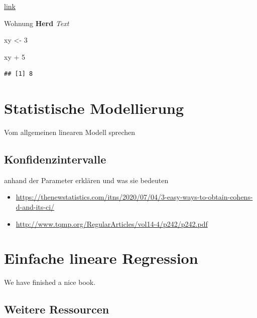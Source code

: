 \documentclass[
]{book}
\newenvironment{Shaded}{\begin{snugshade}}{\end{snugshade}}
\newcommand{\DecValTok}[1]{\textcolor[rgb]{0.00,0.00,0.81}{#1}}
\newcommand{\NormalTok}[1]{#1}
\newcommand{\OtherTok}[1]{\textcolor[rgb]{0.56,0.35,0.01}{#1}}
\newcommand{\SpecialCharTok}[1]{\textcolor[rgb]{0.00,0.00,0.00}{#1}}
\providecommand{\tightlist}{%
  \setlength{\itemsep}{0pt}\setlength{\parskip}{0pt}}
\begin{document}
\href{www.zeit.de}{link}

Wohnung \textbf{Herd} \emph{Text}

\begin{Shaded}
\begin{Highlighting}[]
\NormalTok{xy }\OtherTok{\textless{}{-}} \DecValTok{3} 
\end{Highlighting}
\end{Shaded}

\begin{Shaded}
\begin{Highlighting}[]
\NormalTok{xy }\SpecialCharTok{+} \DecValTok{5}
\end{Highlighting}
\end{Shaded}

\begin{verbatim}
## [1] 8
\end{verbatim}

\hypertarget{statistische-modellierung}{%
\chapter{Statistische Modellierung}\label{statistische-modellierung}}

Vom allgemeinen linearen Modell sprechen

\hypertarget{konfidenzintervalle}{%
\section{Konfidenzintervalle}\label{konfidenzintervalle}}

anhand der Parameter erklären und was sie bedeuten

\begin{itemize}
\tightlist
\item
  \url{https://thenewstatistics.com/itns/2020/07/04/3-easy-ways-to-obtain-cohens-d-and-its-ci/}
\item
  \url{http://www.tqmp.org/RegularArticles/vol14-4/p242/p242.pdf}
\end{itemize}

\hypertarget{einfache-lineare-regression}{%
\chapter{Einfache lineare Regression}\label{einfache-lineare-regression}}

We have finished a nice book.

\hypertarget{weitere-ressourcen}{%
\section{Weitere Ressourcen}\label{weitere-ressourcen}}
\end{document}
